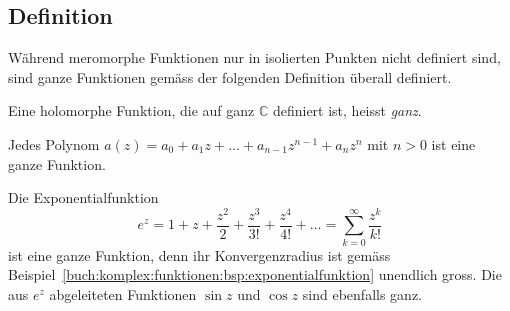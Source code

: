 %
%
%
\subsection{Definition
\label{buch:analytisch:ganz:subsection:definition}}
Während meromorphe Funktionen nur in isolierten Punkten nicht definiert
sind, sind ganze Funktionen gemäss der folgenden Definition überall
definiert.

\begin{definition}
Eine holomorphe Funktion, die auf ganz $\mathbb{C}$ definiert ist,
heisst \emph{ganz}.
%
\end{definition}

\begin{beispiel}
Jedes Polynom $a(z) = a_0 + a_1z + \ldots + a_{n-1}z^{n-1} + a_nz^n$ 
mit $n>0$ ist eine ganze Funktion.
\end{beispiel}

\begin{beispiel}
Die Exponentialfunktion
\[
e^z
=
1
+
z
+
\frac{z^2}{2}
+
\frac{z^3}{3!}
+
\frac{z^4}{4!}
+
\ldots
=
\sum_{k=0}^\infty \frac{z^k}{k!}
\]
ist eine ganze Funktion, denn ihr Konvergenzradius ist gemäss
Beispiel~\ref{buch:komplex:funktionen:bsp:exponentialfunktion}
unendlich gross.
Die aus $e^z$ abgeleiteten Funktionen $\sin z$ und $\cos z$ sind
ebenfalls ganz.
\end{beispiel}

